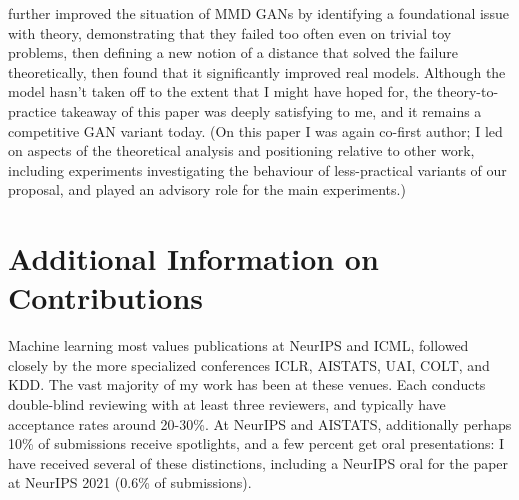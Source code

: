 \documentclass[12pt]{article}
\newcommand{\bibeqcon}{{\footnotemark[1]}}
\begin{document}
\cite{arbel:smmd} further improved the situation of MMD GANs by identifying a foundational issue with theory, demonstrating that they failed too often even on trivial toy problems, then defining a new notion of a distance that solved the failure theoretically, then found that it significantly improved real models. Although the model hasn't taken off to the extent that I might have hoped for, the theory-to-practice takeaway of this paper was deeply satisfying to me, and it remains a competitive GAN variant today. (On this paper I was again co-first author; I led on aspects of the theoretical analysis and positioning relative to other work, including experiments investigating the behaviour of less-practical variants of our proposal, and played an advisory role for the main experiments.)


\clearpage
\section{Additional Information on Contributions}
\renewcommand{\bibeqcon}{{\footnotemark[1]}}
\renewcommand{\thefootnote}{\fnsymbol{footnote}}  %
Machine learning most values publications at NeurIPS and ICML, followed closely by the more specialized conferences ICLR, AISTATS, UAI, COLT, and KDD. The vast majority of my work has been at these venues. Each conducts double-blind reviewing with at least three reviewers, and typically have acceptance rates around 20-30\%.
At NeurIPS and AISTATS, additionally perhaps 10\% of submissions receive spotlights, and a few percent get oral presentations: I have received several of these distinctions, including a NeurIPS oral for the paper \cite{koehler:gaussian-interpolators} at NeurIPS 2021 (0.6\% of submissions).
\end{document}
